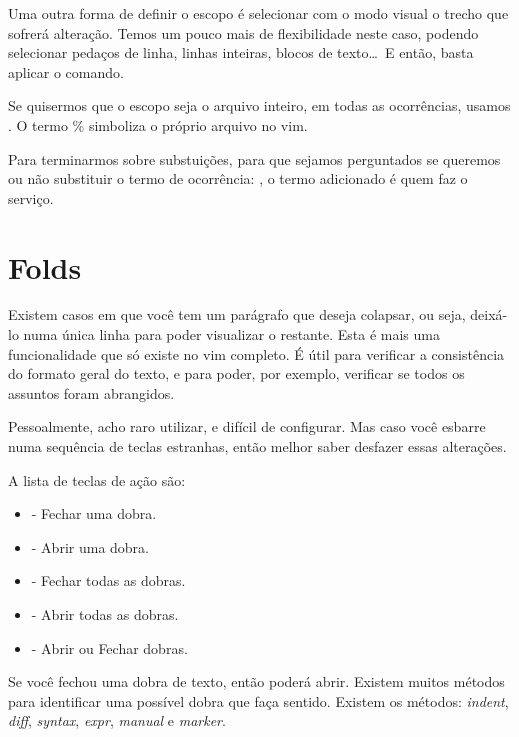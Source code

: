 Uma outra forma de definir o escopo é selecionar com o modo visual o trecho
que sofrerá alteração.
Temos um pouco mais de flexibilidade neste caso, podendo selecionar pedaços de linha,
linhas inteiras,
blocos de texto\ldots\
E então, basta aplicar o comando.

Se quisermos que o escopo seja o arquivo inteiro, em todas as ocorrências, usamos .
O termo \% simboliza o próprio arquivo no vim.



Para terminarmos sobre substuições, para que sejamos perguntados se queremos ou não substituir o termo de ocorrência:
\vimcommand{:\%s/ocorr/subst/gc}, o termo \vimcommand{c} adicionado é quem faz o serviço.

\section{Folds}
Existem casos em que você tem um parágrafo que deseja colapsar, ou seja, deixá-lo numa única linha para poder visualizar o restante.
Esta é mais uma funcionalidade que só existe no vim completo.
É útil para verificar a consistência do formato geral do texto, e para poder, por exemplo, verificar se todos os assuntos foram abrangidos.

Pessoalmente, acho raro utilizar, e difícil de configurar.
Mas caso você esbarre numa sequência de teclas estranhas, então melhor saber desfazer essas alterações.

A lista de teclas de ação são:
\begin{itemize}
    \item {} - Fechar uma dobra.
    \item {} - Abrir uma dobra.
    \item {} - Fechar todas as dobras.
    \item {} - Abrir todas as dobras.
    \item {} - Abrir ou Fechar dobras.
\end{itemize}

Se você fechou uma dobra de texto, então poderá abrir.
Existem muitos métodos para identificar uma possível dobra que faça sentido.
Existem os métodos: \textit{indent}, \textit{diff}, \textit{syntax}, \textit{expr}, \textit{manual} e \textit{marker}.


